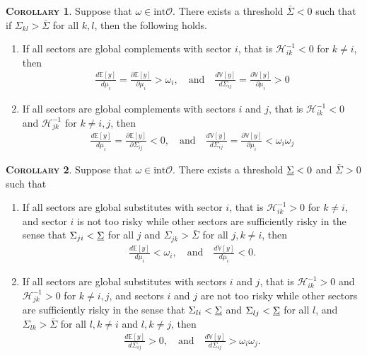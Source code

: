 \documentclass[11pt]{article}
\theoremstyle{definition}
\newtheorem{cor}{\noindent \textbf{\textsc{Corollary}}}
\begin{document}
	\begin{cor}
		Suppose that $\omega\in\text{int}\mathcal{O}$. There exists a threshold $\bar{\Sigma} < 0$ such that if $\Sigma_{kl} > \bar{\Sigma}$ for all $k, l$, then the following holds.
		\begin{enumerate}[leftmargin=1cm, label=\arabic*.]
			\item If all sectors are global complements with sector $i$, that is $\mathcal{H}_{ik}^{-1} < 0$ for $k\neq i$, then
			\begin{align*}
				\frac{d\mathbb{E}[y]}{d\mu_i} = \frac{\partial\mathbb{E}[y]}{\partial\mu_i} > \omega_i, \quad \text{and} \quad \frac{d\mathbb{V}[y]}{d\Sigma_{ij}} = \frac{\partial\mathbb{V}[y]}{\partial\mu_i} > 0
			\end{align*}
			\item If all sectors are global complements with sectors $i$ and $j$, that is $\mathcal{H}_{ik}^{-1} < 0$ and $\mathcal{H}_{jk}^{-1}$ for $k \neq i, j$, then
			\begin{align*}
				\frac{d\mathbb{E}[y]}{d\mu_i} = \frac{\partial\mathbb{E}[y]}{\partial\Sigma_{ij}} < 0, \quad \text{and} \quad \frac{d\mathbb{V}[y]}{d\Sigma_{ij}} = \frac{\partial\mathbb{V}[y]}{\partial\mu_i} < \omega_i\omega_j
			\end{align*}
		\end{enumerate}
	\end{cor}
	
	\begin{cor}
		Suppose that $\omega\in\text{int}\mathcal{O}$. There exists a threshold $\uline{\Sigma} < 0$ and $\bar{\Sigma}>0$ such that
		\begin{enumerate}[leftmargin=1cm, label=\arabic*.]
			\item If all sectors are global substitutes with sector $i$, that is $\mathcal{H}_{ik}^{-1} > 0$ for $k\neq i$, and sector $i$ is not too risky while other sectors are sufficiently risky in the sense that $\Sigma_{ji} < \uline{\Sigma}$ for all $j$ and $\Sigma_{jk} > \bar{\Sigma}$ for all $j, k\neq i$, then
			\begin{align*}
				\frac{d\mathbb{E}[y]}{d\mu_i} < \omega_i,\quad \text{and}\quad \frac{d\mathbb{V}[y]}{d\mu_i} < 0.
			\end{align*}
			\item If all sectors are global substitutes with sectors $i$ and $j$, that is $\mathcal{H}_{ik}^{-1} > 0$ and $\mathcal{H}_{jk}^{-1} > 0$ for $k\neq i,j$, and sectors $i$ and $j$ are not too risky while other sectors are sufficiently risky in the sense that $\Sigma_{li}<\uline{\Sigma}$ and $\Sigma_{lj} < \uline{\Sigma}$ for all $l$, and $\Sigma_{lk}>\bar{\Sigma}$ for all $l, k\neq i$ and $l, k \neq j$, then
			\begin{align*}
				\frac{d\mathbb{E}[y]}{d\Sigma_{ij}} > 0,\quad \text{and}\quad \frac{d\mathbb{V}[y]}{d\Sigma_{ij}} > \omega_i\omega_j.
			\end{align*}
		\end{enumerate} 
	\end{cor}
	
\end{document}
